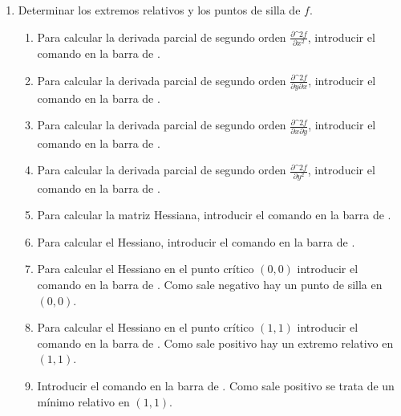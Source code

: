 \begin{enumerate}[leftmargin=*]
\begin{enumerate}
      \item Determinar los extremos relativos y los puntos de silla de $f$.
            \begin{indication}
            \begin{enumerate}
            \item Para calcular la derivada parcial de segundo orden $\frac{\partial\^2 f}{\partial x^2}$, introducir el comando  en la barra de .
            \item Para calcular la derivada parcial de segundo orden $\frac{\partial\^2 f}{\partial y\partial x}$, introducir el comando  en la barra de .
            \item Para calcular la derivada parcial de segundo orden $\frac{\partial\^2 f}{\partial x\partial y}$, introducir el comando  en la barra de .
            \item Para calcular la derivada parcial de segundo orden $\frac{\partial\^2 f}{\partial y^2}$, introducir el comando  en la barra de .
            \item Para calcular la matriz Hessiana, introducir el comando  en la barra de .
            \item Para calcular el Hessiano, introducir el comando  en la barra de .
            \item Para calcular el Hessiano en el punto crítico $(0,0)$ introducir el comando  en la barra de . Como sale negativo hay un punto de silla en $(0,0)$.
            \item Para calcular el Hessiano en el punto crítico $(1,1)$ introducir el comando  en la barra de . Como sale positivo hay un extremo relativo en $(1,1)$.
            \item Introducir el comando  en la barra de . Como sale positivo se trata de un mínimo relativo en $(1,1)$.
            \end{enumerate}
            \end{indication}
      \end{enumerate}

\end{enumerate}


